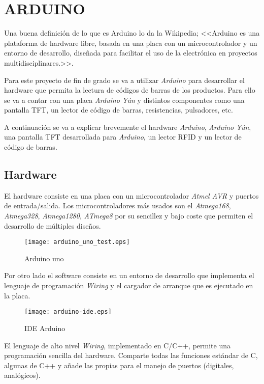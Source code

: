 \section{ARDUINO}

Una buena definición de lo que es Arduino lo da la Wikipedia; <<Arduino es una plataforma de hardware libre, basada en una placa con un microcontrolador y un entorno de desarrollo, diseñada para facilitar el uso de la electrónica en proyectos multidisciplinares.>>.

Para este proyecto de fin de grado se va a utilizar \emph{Arduino} para desarrollar el hardware que permita la lectura de códigos de barras de los productos. Para ello se va a contar con una placa \emph{Arduino Yún} y distintos componentes como una pantalla TFT, un lector de código de barras, resistencias, pulsadores, etc.

A continuación se va a explicar brevemente el hardware \emph{Arduino}, \emph{Arduino Yún}, una pantalla TFT desarrollada para \emph{Arduino}, un lector RFID y un lector de código de barras.

\subsection{Hardware}

El hardware consiste en una placa con un microcontrolador \emph{Atmel AVR} y puertos de entrada/salida. Los microcontroladores más usados son el \emph{Atmega168}, \emph{Atmega328}, \emph{Atmega1280}, \emph{ATmega8} por su sencillez y bajo coste que permiten el desarrollo de múltiples diseños.

\begin{figure}[h!]
    \centering
    \texttt{[image: arduino\_uno\_test.eps]}
    \caption{Arduino uno}\label{fig:arduino_uno_test}
\end{figure}


Por otro lado el software consiste en un entorno de desarrollo que implementa el lenguaje de programación \emph{Wiring} y el cargador de arranque que es ejecutado en la placa.

\begin{figure}[h!]
    \centering
    \texttt{[image: arduino-ide.eps]}
    \caption{IDE Arduino}\label{fig:arduino-ide}
\end{figure}

El lenguaje de alto nivel \emph{Wiring}, implementado en C/C++, permite una programación sencilla del hardware. Comparte todas las funciones estándar de C, algunas de C++ y añade las propias para el manejo de puertos (digitales, analógicos).

